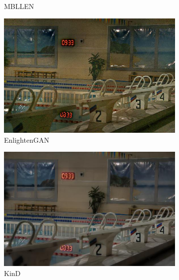 \documentclass[a4paper]{ctexart}
\begin{document}
\begin{figure}[htb]
\begin{subfigure}{0.19\textwidth}
				\captionsetup{font=scriptsize}
				\caption{MBLLEN}
				\label{fig: MBLLEN}
			\end{subfigure}
			\begin{subfigure}{0.19\textwidth}
				\includegraphics[width=\linewidth]{picture/LLIE/Experiment/EnlightenGAN}
				\captionsetup{font=scriptsize}
				\caption{EnlightenGAN}
				\label{fig: EnlightenGAN}
			\end{subfigure}
			\begin{subfigure}{0.19\textwidth}
				\includegraphics[width=\linewidth]{picture/LLIE/Experiment/KinD}
				\captionsetup{font=scriptsize}
				\caption{KinD}
				\label{fig: KinD}
			\end{subfigure}\\
			\begin{subfigure}{0.19\textwidth}

\end{subfigure}
\end{figure}
\end{document}
